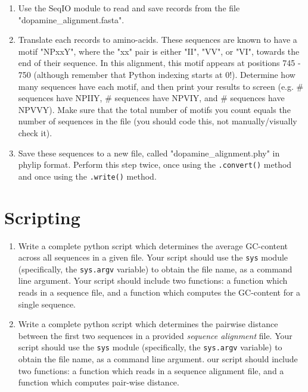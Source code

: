 \documentclass{article}[12pt]
\newcommand{\code}[1]{\texttt{#1}}  %
\begin{document}
\begin{enumerate}[itemsep=5ex]
	\begin{enumerate}[itemsep=2ex]
		\item Use the SeqIO module to read and save records from the file "dopamine\_alignment.fasta".
		\item Translate each records to amino-acids. These sequences are known to have a motif "NPxxY", where the "xx" pair is either "II", "VV", or "VI", towards the end of their sequence. In this alignment, this motif appears at positions 745 - 750 (although remember that Python indexing starts at 0!). Determine how many sequences have each motif, and then print your results to screen (e.g. \# sequences have NPIIY, \# sequences have NPVIY, and \# sequences have NPVVY). Make sure that the total number of motifs you count equals the number of sequences in the file (you should code this, not manually/visually check it).
		\item Save these sequences to a new file, called "dopamine\_alignment.phy" in phylip format. Perform this step twice, once using the \code{.convert()} method and once using the \code{.write()} method.
			
		\end{enumerate}

\end{enumerate}

\section*{Scripting}

\begin{enumerate}
	\item Write a complete python script which determines the average GC-content across all sequences in a given file. Your script should use the \code{sys} module (specifically, the \code{sys.argv} variable) to obtain the file name, as a command line argument. Your script should include two functions: a function which reads in a sequence file, and a function which computes the GC-content for a single sequence.
	
	\item Write a complete python script which determines the pairwise distance between the first two sequences in a provided \emph{sequence alignment} file. Your script should use the \code{sys} module (specifically, the \code{sys.argv} variable) to obtain the file name, as a command line argument. our script should include two functions: a function which reads in a sequence alignment file, and a function which computes pair-wise distance.

	
\end{enumerate}
	

	







\end{document}
